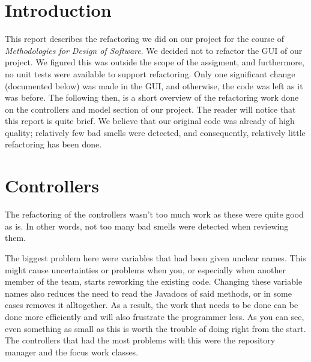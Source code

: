 





\newpage
\maakvoorblad

\newpage

\tableofcontents

\newpage

\section{Introduction}
This report describes the refactoring we did on our project for the course of \emph{Methodologies for Design of Software}.
We decided not to refactor the GUI of our project. We figured this was outside the scope of the assigment, and furthermore, no unit tests were available to support refactoring. Only one significant change (documented below) was made in the GUI, and otherwise, the code was left as it was before. The following then, is a short overview of the refactoring work done on the controllers and model section of our project. The reader will notice that this report is quite brief. We believe that our original code was already of high quality; relatively few bad smells were detected, and consequently, relatively little refactoring has been done.

\section{Controllers}
The refactoring of the controllers wasn't too much work as these were quite good as is. In other words, not too many bad smells were detected when reviewing them.

The biggest problem here were variables that had been given unclear names. This might cause uncertainties or problems when you, or especially when another member of the team, starts reworking the existing code. Changing these variable names also reduces the need to read the Javadocs of said methods, or in some cases removes it alltogether. As a result, the work that needs to be done can be done more efficiently and will also frustrate the programmer less. As you can see, even something as small as this is worth the trouble of doing right from the start. 
The controllers that had the most problems with this were the repository manager and the focus work classes.

